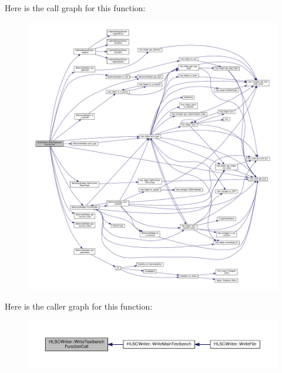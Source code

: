 Here is the call graph for this function\+:
\nopagebreak
\begin{figure}[H]
\begin{center}
\leavevmode
\includegraphics[width=350pt]{d4/db1/classHLSCWriter_a65f826c5a0e6536a762985601e621250_cgraph}
\end{center}
\end{figure}
Here is the caller graph for this function\+:
\nopagebreak
\begin{figure}[H]
\begin{center}
\leavevmode
\includegraphics[width=350pt]{d4/db1/classHLSCWriter_a65f826c5a0e6536a762985601e621250_icgraph}
\end{center}
\end{figure}
\mbox{\label{classHLSCWriter_a5fdaae40bf4d22a922ce36aa8439f92b}} 
